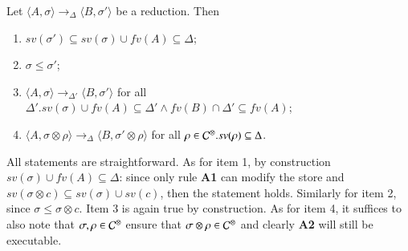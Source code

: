 \documentclass[main.tex]{subfiles}
\begin{document}
\begin{lemma}[On monotonicity]
\label{mono}
Let $\langle A, \sigma \rangle \rightarrow_\Delta \langle B, \sigma' \rangle$ be a reduction. 
Then
\begin{enumerate}
\item $sv(\sigma') \subseteq sv(\sigma)\cup fv(A) \subseteq \Delta$;
\item $\sigma \leq \sigma'$;
\item $\langle A, \sigma \rangle \rightarrow_{\Delta'} \langle B, \sigma' \rangle$
         for all $\Delta'. sv(\sigma)\cup fv(A) \subseteq \Delta' \wedge fv(B) \cap \Delta' \subseteq fv(A)$;
\item $\langle A, \sigma \otimes \rho \rangle \rightarrow_\Delta \langle B, \sigma' \otimes \rho \rangle$
         for all $\rho \in  {\mathcal C}^\otimes. sv(\rho) \subseteq \Delta$. 
\end{enumerate}
 \end{lemma}
 
 All statements are straightforward. 
%
%
As for item 1, by construction $sv(\sigma)\cup fv(A) \subseteq \Delta$: since 
only rule {\bf A1} can modify the store
and $sv(\sigma \otimes c) \subseteq sv(\sigma) \cup sv(c)$, then the statement holds.
Similarly for item 2, since $\sigma \leq \sigma \otimes c$.
Item 3 is again true by construction. 
As for item 4, it suffices to also note that 
$\sigma, \rho \in  {\mathcal C}^\otimes$ ensure that $\sigma \otimes \rho \in  {\mathcal C}^\otimes$
and clearly {\bf A2} will still be executable. 

%
%
\end{document}
